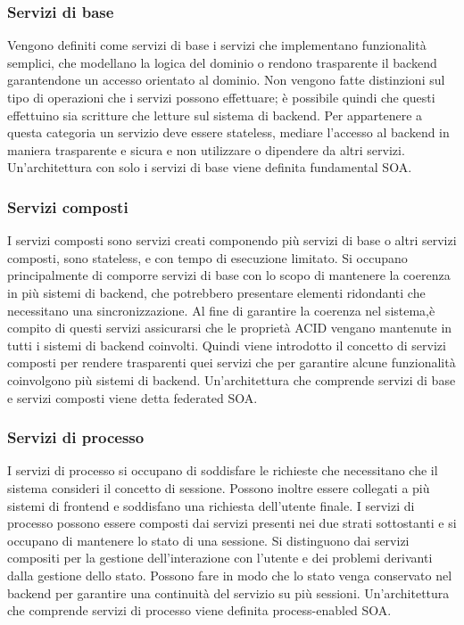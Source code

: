 \documentclass[a4paper,12pt]{report}
\begin{document}
\subsubsection{Servizi di base}
Vengono definiti come servizi di base i servizi che implementano funzionalità semplici, che modellano la logica del dominio o rendono trasparente il backend garantendone un accesso orientato al dominio.
Non vengono fatte distinzioni sul tipo di operazioni che i servizi possono effettuare; è possibile quindi che questi effettuino sia scritture che letture sul sistema di backend.
Per appartenere a questa categoria un servizio deve essere stateless, mediare l'accesso al backend in maniera trasparente e sicura e non utilizzare o dipendere da altri servizi.
Un'architettura con solo i servizi di base viene definita fundamental SOA.  
\subsubsection{Servizi composti }
I servizi composti sono servizi creati componendo più servizi di base o altri servizi composti, sono stateless, e con tempo di esecuzione limitato. 
Si occupano principalmente di comporre servizi di base con lo scopo di mantenere la coerenza in più sistemi di backend, che potrebbero presentare elementi ridondanti che necessitano una sincronizzazione.
Al fine di garantire la coerenza nel sistema,è compito di questi servizi  assicurarsi che le proprietà ACID vengano mantenute in tutti i sistemi di backend coinvolti.
Quindi viene introdotto il concetto di servizi composti per rendere trasparenti quei servizi che per garantire alcune funzionalità coinvolgono più sistemi di backend.
Un'architettura che comprende servizi di base e servizi composti viene detta federated SOA.
\subsubsection{Servizi di processo}
I servizi di processo si occupano di soddisfare le richieste che necessitano che il sistema consideri il concetto di sessione.
Possono inoltre essere collegati a più sistemi di frontend e soddisfano una richiesta dell'utente finale.
I servizi di processo possono essere composti dai servizi presenti nei due strati sottostanti e si occupano di mantenere lo stato di una sessione.
Si distinguono dai servizi compositi per la gestione dell'interazione con l'utente e dei problemi derivanti dalla gestione dello stato.
Possono fare in modo che lo stato venga conservato nel backend per garantire una continuità del servizio su più sessioni. 
Un'architettura che comprende servizi di processo viene definita process-enabled SOA. 
\end{document}
